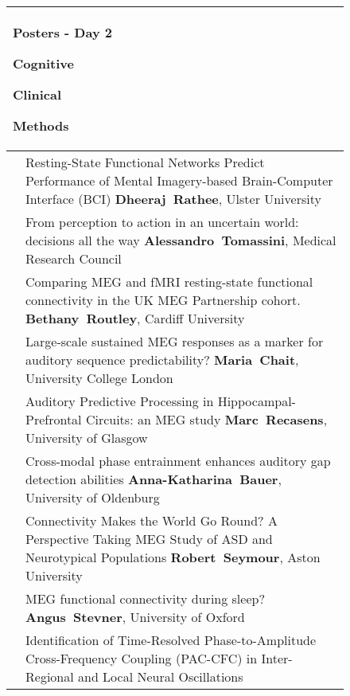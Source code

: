 \begin{figure}[htp]
\centering
\footnotesize
\begin{tabularx}{\textwidth}{lp{.92\linewidth}}
\multicolumn{2}{l}{\Large Posters - Day 2 \hspace{8cm} \colorbox{set1!50}{\small\strut Cognitive}\colorbox{set2!50}{\small\strut Clinical}\colorbox{set3!50}{\small\strut Methods}}\\
\toprule
\cellcolor{set1!50}{\bf B-1} & {\footnotesize Resting-State Functional Networks Predict Performance of Mental Imagery-based Brain-Computer Interface (BCI)
} {\bf\footnotesize Dheeraj~Rathee}, {\footnotesize Ulster University}  \\
\cellcolor{set1!50}{\bf B-2} & {\footnotesize From perception to action in an uncertain world: decisions all the way
} {\bf\footnotesize Alessandro~Tomassini}, {\footnotesize Medical Research Council}  \\
\cellcolor{set3!50}{\bf B-3} & {\footnotesize Comparing MEG and fMRI resting-state functional connectivity in the UK MEG Partnership cohort.
} {\bf\footnotesize Bethany~Routley}, {\footnotesize Cardiff University}  \\
\cellcolor{set1!50}{\bf B-4} & {\footnotesize Large-scale sustained MEG responses as a marker for auditory sequence predictability?
} {\bf\footnotesize Maria~Chait}, {\footnotesize University College London}  \\
\cellcolor{set1!50}{\bf B-5} & {\footnotesize Auditory Predictive Processing in Hippocampal-Prefrontal Circuits: an MEG study} {\bf\footnotesize Marc~Recasens}, {\footnotesize University of Glasgow}  \\
\cellcolor{set1!50}{\bf B-6} & {\footnotesize Cross-modal phase entrainment enhances auditory gap detection abilities
} {\bf\footnotesize Anna-Katharina~Bauer}, {\footnotesize University of Oldenburg}  \\
\cellcolor{set2!50}{\bf B-7} & {\footnotesize Connectivity Makes the World Go Round? A Perspective Taking MEG Study of ASD and Neurotypical Populations 
} {\bf\footnotesize Robert~Seymour}, {\footnotesize Aston University}  \\
\cellcolor{set1!50}{\bf B-8} & {\footnotesize MEG functional connectivity during sleep?} {\bf\footnotesize Angus~Stevner}, {\footnotesize University of Oxford}  \\
\cellcolor{set3!50}{\bf B-9} & {\footnotesize Identification of Time-Resolved Phase-to-Amplitude Cross-Frequency Coupling (PAC-CFC) in Inter-Regional and Local Neural Oscillations
}
\end{tabularx}
\end{figure}
